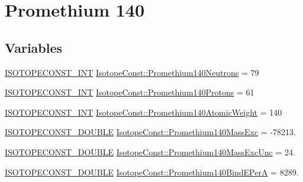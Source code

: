 \hypertarget{group___isotope_const-_promethium-_pm140}{}\section{Promethium 140}
\label{group___isotope_const-_promethium-_pm140}
\subsection*{Variables}
\begin{DoxyCompactItemize}
\item 
\mbox{\hyperlink{group___isotope_const-_macros_ga5f18360b3e99483a35c32d789e62621c}{I\+S\+O\+T\+O\+P\+E\+C\+O\+N\+S\+T\+\_\+\+I\+NT}} \mbox{\hyperlink{group___isotope_const-_promethium-_pm140_ga8b1c7dd0afe634455a22282bc0a0e229}{Isotope\+Const\+::\+Promethium140\+Neutrons}} = 79
\item 
\mbox{\hyperlink{group___isotope_const-_macros_ga5f18360b3e99483a35c32d789e62621c}{I\+S\+O\+T\+O\+P\+E\+C\+O\+N\+S\+T\+\_\+\+I\+NT}} \mbox{\hyperlink{group___isotope_const-_promethium-_pm140_gac95775360e36bdea3048b143670de5ea}{Isotope\+Const\+::\+Promethium140\+Protons}} = 61
\item 
\mbox{\hyperlink{group___isotope_const-_macros_ga5f18360b3e99483a35c32d789e62621c}{I\+S\+O\+T\+O\+P\+E\+C\+O\+N\+S\+T\+\_\+\+I\+NT}} \mbox{\hyperlink{group___isotope_const-_promethium-_pm140_ga51eb8b2609a906032800031ee971365a}{Isotope\+Const\+::\+Promethium140\+Atomic\+Weight}} = 140
\item 
\mbox{\hyperlink{group___isotope_const-_macros_ga8f45a7272ce02c0b4c65c44636ed719a}{I\+S\+O\+T\+O\+P\+E\+C\+O\+N\+S\+T\+\_\+\+D\+O\+U\+B\+LE}} \mbox{\hyperlink{group___isotope_const-_promethium-_pm140_ga624470353496f375b1a13ba711adea6d}{Isotope\+Const\+::\+Promethium140\+Mass\+Exc}} = -\/78213.
\item 
\mbox{\hyperlink{group___isotope_const-_macros_ga8f45a7272ce02c0b4c65c44636ed719a}{I\+S\+O\+T\+O\+P\+E\+C\+O\+N\+S\+T\+\_\+\+D\+O\+U\+B\+LE}} \mbox{\hyperlink{group___isotope_const-_promethium-_pm140_gae91f2cfcc9d343f137b1f2a7dfdb9628}{Isotope\+Const\+::\+Promethium140\+Mass\+Exc\+Unc}} = 24.
\item 
\mbox{\hyperlink{group___isotope_const-_macros_ga8f45a7272ce02c0b4c65c44636ed719a}{I\+S\+O\+T\+O\+P\+E\+C\+O\+N\+S\+T\+\_\+\+D\+O\+U\+B\+LE}} \mbox{\hyperlink{group___isotope_const-_promethium-_pm140_gad6779d0d015cef75e51f5b981cf8dbaf}{Isotope\+Const\+::\+Promethium140\+Bind\+E\+PerA}} = 8289.

\end{DoxyCompactItemize}
